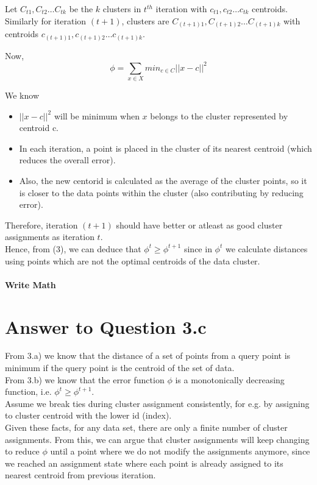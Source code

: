 \documentclass[11pt]{article}
\begin{document}
{Let $C_{t1}, C_{t2} \hdots C_{tk}$ be the $k$ clusters in $t^{th}$ iteration with $c_{t1}, c_{t2} \hdots c_{tk}$ centroids. Similarly for iteration $(t+1)$, clusters are $C_{(t+1)1}, C_{(t+1)2} \hdots C_{(t+1)k}$ with centroids $c_{(t+1)1}, c_{(t+1)2} \hdots c_{(t+1)k}$.

Now, $$\phi = \sum_{x \in X} min_{c \in C} ||x-c||^2$$

We know 
\begin{itemize}
\item $||x-c||^2$ will be minimum when $x$ belongs to the cluster represented by centroid c.
\item In each iteration, a point is placed in the cluster of its nearest centroid (which reduces the overall error).
\item Also, the new centorid is calculated as the average of the cluster points, so it is closer to the data points within the cluster (also contributing by reducing error).
\end{itemize}

Therefore, iteration $(t+1)$ should have better or atleast as good cluster assignments as iteration $t$. \\

Hence, from (3), we can deduce that $\phi^t \geq \phi^{t+1}$ since in $\phi^t$ we calculate distances using points which are not the optimal centroids of the data cluster.
\\\\
\textbf{Write Math}

\pagebreak[4]
\section*{Answer to Question 3.c}

From 3.a) we know that the distance of a set of points from a query point is minimum if the query point is the centroid of the set of data. \\
From 3.b) we know that the error function $\phi$ is a monotonically decreasing function, i.e. $\phi^t \geq \phi^{t+1}$.\\
Assume we break ties during cluster assignment consistently, for e.g. by assigning to cluster centroid with the lower id (index). \\

Given these facts, for any data set, there are only a finite number of cluster assignments. From this, we can argue that cluster assignments will keep changing to reduce $\phi$ until a point where we do not modify the assignments anymore, since we reached an assignment state where each point is already assigned to its nearest centroid from previous iteration.\\

}
\end{document}
